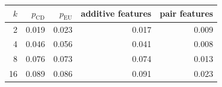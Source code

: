 \footnotesize
\begin{tabular}{rrrrr}
\toprule
$k$ & $p_{\mathrm{CD}}$ & $p_{\mathrm{EU}}$ & additive features & pair features \\
\midrule
2 & 0.019 & 0.023 & 0.017 & 0.009 \\
4 & 0.046 & 0.056 & 0.041 & 0.008 \\
8 & 0.076 & 0.073 & 0.074 & 0.013 \\
16 & 0.089 & 0.086 & 0.091 & 0.023 \\
\bottomrule
\end{tabular}
